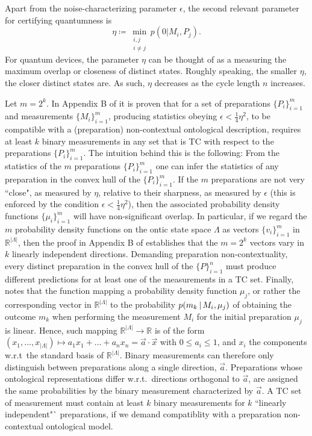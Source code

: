 Apart from the noise-characterizing parameter $\epsilon$, the second relevant parameter for certifying quantumness is
\begin{equation*}
\eta\coloneqq \min_{\substack{i,j \\ i\neq j}} p(0\vert M_i, P_j).
\end{equation*}
For quantum devices, the parameter $\eta$ can be thought of as a measuring the maximum overlap or closeness of distinct states. Roughly speaking, the smaller $\eta$, the closer distinct states are. As such, $\eta$ decreases as the cycle length $n$ increases. 

Let $m=2^k$. In Appendix B of \cite{Pusey2019a} it is proven that for a set of preparations $\{P_i\}_{i=1}^m$ and measurements $\{M_i\}_{i=1}^m$, producing statistics obeying $\epsilon<\frac{1}{4}\eta^2$, to be compatible with a (preparation) non-contextual ontological description, requires at least $k$ binary measurements in any set that is TC with respect to the preparations $\{P_i\}_{i=1}^m$. The intuition behind this is the following: From the statistics of the $m$ preparations $\{P_i\}_{i=1}^m$ one can infer the statistics of any preparation in the convex hull of the $\{P_i\}_{i=1}^m$. If the $m$ preparations are not very ``close", as measured by $\eta$, relative to their sharpness, as measured by $\epsilon$ (this is enforced by the condition $\epsilon<\frac{1}{4}\eta^2$), then the associated probability density functions $\{\mu_i\}_{i=1}^m$ will have non-significant overlap. In particular, if we regard the $m$ probability density functions on the ontic state space $\Lambda$ as vectors $\{v_i\}_{i=1}^m$ in $\mathbb{R}^{\vert \Lambda \vert}$, then the proof in Appendix B of \cite{Pusey2019a} establishes that the $m=2^k$ vectors vary in $k$ linearly independent directions. Demanding preparation non-contextuality, every distinct preparation in the convex hull of the $\{P\}_{i=1}^n$ must produce different predictions for at least one of the measurements in a TC set. Finally, \cite{Pusey2019a} notes that the function mapping a probability density function $\mu_j$, or rather the corresponding vector in $\mathbb{R}^{\vert \Lambda \vert}$ to the probability $p(m_k\thinspace\vert\thinspace M_i,\mu_j)$ of obtaining the outcome $m_k$ when performing the measurement $M_i$ for the initial preparation $\mu_j$ is linear. Hence, such mapping $\mathbb{R}^{\vert \Lambda \vert}\rightarrow\mathbb{R}$ is of the form $(x_1,\dots,x_{\vert \Lambda \vert})\mapsto a_1 x_1+\dots + a_n x_n = \vec{a}\cdot \vec{x}$ with $0 \leq a_i \leq 1$, and $x_i$ the components w.r.t\ the standard basis of $\mathbb{R}^{\vert \Lambda \vert}$. Binary measurements can therefore only distinguish between preparations along a single direction, $\vec{a}$. Preparations whose ontological representations differ w.r.t.\ directions orthogonal to $\vec{a}$, are assigned the same probabilities by the binary measurement characterized by $\vec{a}$. A TC set of measurement must contain at least $k$ binary measurements for $k$ ``linearly independent"` preparations, if we demand compatiblity with a preparation non-contextual ontological model.


